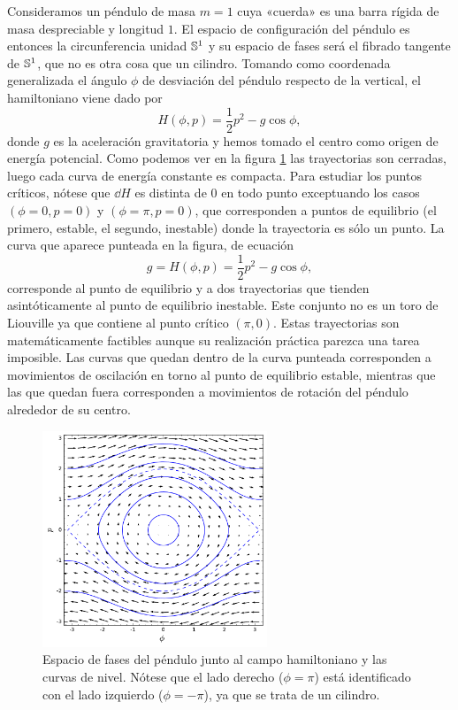   Consideramos un péndulo de masa $m=1$ cuya «cuerda» es una barra rígida de masa despreciable y longitud $1$. El espacio de configuración del péndulo es entonces la circunferencia unidad $\mathbb{S}^1$ y su espacio de fases será el fibrado tangente de $\mathbb{S}^1$, que no es otra cosa que un cilindro. Tomando como coordenada generalizada el ángulo $\phi$ de desviación del péndulo respecto de la vertical, el hamiltoniano viene dado por 
  \begin{equation*}
    H(\phi,p)=\frac{1}{2}p^2 - g\cos\phi,
  \end{equation*}
  donde $g$ es la aceleración gravitatoria y hemos tomado el centro como origen de energía potencial.
  Como podemos ver en la figura \ref{fig:pendulo}  las trayectorias son cerradas, luego cada curva de energía constante es compacta. Para estudiar los puntos críticos, nótese que $\dd H$ es distinta de 0 en todo punto exceptuando los casos $(\phi=0,p=0)$ y $(\phi=\pi,p=0)$, que corresponden a puntos de equilibrio (el primero, estable, el segundo, inestable) donde la trayectoria es sólo un punto. La curva que aparece punteada en la figura, de ecuación
  \begin{equation*}
    g=H(\phi,p)=\frac{1}{2}p^2 - g \cos\phi ,
  \end{equation*}
   corresponde al punto de equilibrio y a dos trayectorias que tienden asintóticamente al punto de equilibrio inestable. Este conjunto no es un toro de Liouville ya que contiene al punto crítico $(\pi,0)$. Estas trayectorias son matemáticamente factibles aunque su realización práctica parezca una tarea imposible. Las curvas que quedan dentro de la curva punteada corresponden a movimientos de oscilación en torno al punto de equilibrio estable, mientras que las que quedan fuera corresponden a movimientos de rotación del péndulo alrededor de su centro. 
  \begin{figure}[h]
    \centering
    \includegraphics[width=0.6\textwidth]{pics/pendulo}
    \caption{\small Espacio de fases del péndulo junto al campo hamiltoniano y las curvas de nivel. Nótese que el lado derecho ($\phi=\pi$) está identificado con el lado izquierdo ($\phi=-\pi$), ya que se trata de un cilindro.}
    \label{fig:pendulo}
  \end{figure}

